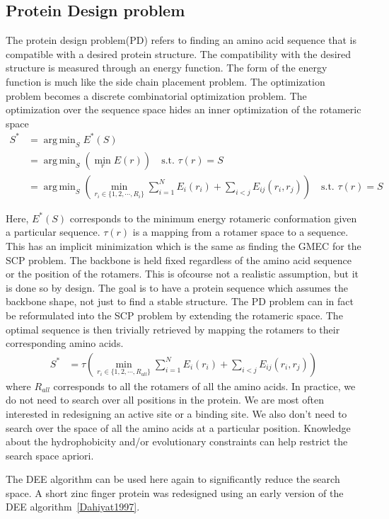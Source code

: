 \documentclass{article}
\DeclareMathOperator*{\argmin}{arg\,min}
\begin{document}
\subsection{Protein Design problem}
The protein design problem(PD) refers to finding an amino acid sequence that is compatible with a desired protein structure. The compatibility with the desired structure is measured through an energy function. The form of the energy function is much like the side chain placement problem. The optimization problem becomes a discrete combinatorial optimization problem. The optimization over the sequence space hides an inner optimization of the rotameric space
\[
\begin{split}
S^* &= \argmin_{S} E^*(S) \\
	&= \argmin_{S} \left( \min_{r} E(r) \right) \quad \text{s.t. $\tau(r)=S$} \\
	&= \argmin_{S} \left( \min_{r_i \in \{1,2,\cdots,R_i\}} \sum_{i=1}^{N}E_i(r_i) + \sum_{i<j}E_{ij}(r_i,r_j) \right) \quad \text{s.t. $\tau(r)=S$}
\end{split}
\]

Here, $E^*(S)$ corresponds to the minimum energy rotameric conformation given a particular sequence. $\tau(r)$ is a mapping from a rotamer space to a sequence. This has an implicit minimization which is the same as finding the GMEC for the SCP problem. The backbone is held fixed regardless of the amino acid sequence or the position of the rotamers. This is  ofcourse not a realistic assumption, but it is done so by design. The goal is to have a protein sequence which assumes the backbone shape, not just to find a stable structure. The PD problem can in fact be reformulated into the SCP problem by extending the rotameric space. The optimal sequence is then trivially retrieved by mapping the rotamers to their corresponding amino acids.
\[
\begin{split}
S^* &= \tau\left( \min_{r_i \in \{1,2,\cdots,R_{all}\}} \sum_{i=1}^{N}E_i(r_i) + \sum_{i<j}E_{ij}(r_i,r_j) \right)
\end{split}
\]
where $R_{all}$ corresponds to all the rotamers of all the amino acids. In practice, we do not need to search over all positions in the protein. We are most often interested in redesigning an active site or a binding site. We also don't need to search over the space of all the amino acids at a particular position. Knowledge about the hydrophobicity and/or evolutionary constraints can help restrict the search space apriori. 


The DEE algorithm can be used here again to significantly reduce the search space. A short zinc finger protein was redesigned using an early version of the DEE algorithm~\ref{Dahiyat1997}. 
\end{document}
